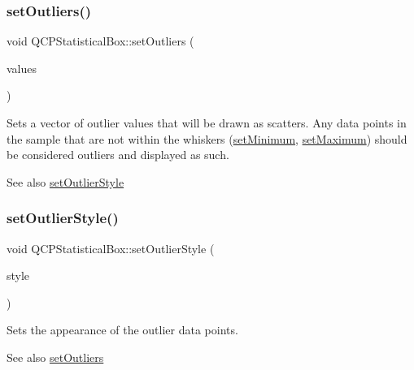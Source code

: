 \subsubsection{\texorpdfstring{set\+Outliers()}{setOutliers()}}
{\footnotesize\ttfamily void Q\+C\+P\+Statistical\+Box\+::set\+Outliers (\begin{DoxyParamCaption}\item[{const Q\+Vector$<$ double $>$ \&}]{values }\end{DoxyParamCaption})}

Sets a vector of outlier values that will be drawn as scatters. Any data points in the sample that are not within the whiskers (\mbox{\hyperlink{class_q_c_p_statistical_box_a84ff7cc61ba44890f0c3e0c99c19941e}{set\+Minimum}}, \mbox{\hyperlink{class_q_c_p_statistical_box_acec5ad1901f00f2c5387cfb4d9787eb3}{set\+Maximum}}) should be considered outliers and displayed as such.

\begin{DoxySeeAlso}{See also}
\mbox{\hyperlink{class_q_c_p_statistical_box_ad5241943422eb8e58360a97e99ad6aa7}{set\+Outlier\+Style}} 
\end{DoxySeeAlso}
\mbox{\label{class_q_c_p_statistical_box_ad5241943422eb8e58360a97e99ad6aa7}} 
\subsubsection{\texorpdfstring{set\+Outlier\+Style()}{setOutlierStyle()}}
{\footnotesize\ttfamily void Q\+C\+P\+Statistical\+Box\+::set\+Outlier\+Style (\begin{DoxyParamCaption}\item[{const \mbox{\hyperlink{class_q_c_p_scatter_style}{Q\+C\+P\+Scatter\+Style}} \&}]{style }\end{DoxyParamCaption})}

Sets the appearance of the outlier data points.

\begin{DoxySeeAlso}{See also}
\mbox{\hyperlink{class_q_c_p_statistical_box_af9bc09620e0bf93bf444ee35e5800d1d}{set\+Outliers}} 
\end{DoxySeeAlso}
\mbox{\label{class_q_c_p_statistical_box_a65a1375f941c5a2077b5201229e89346}} 
